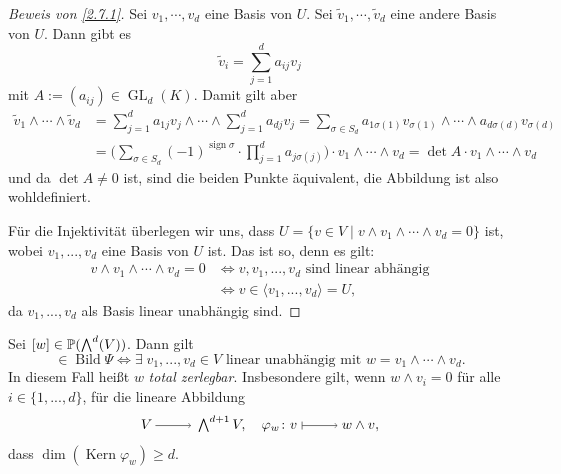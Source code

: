 \documentclass[a4paper,12pt,index=toc]{scrbook}
\theoremstyle{keinenummern} %
\def\P{\mathbb{P}}
\newcommand{\Kern}{\operatorname{Kern}}
\newcommand{\Bild}{\operatorname{Bild}}
\newcommand{\GL}{\operatorname{GL}}
\newcommand{\sign}{\operatorname{sign}}
\renewcommand{\dotsc}{\ensuremath{\!...}}
\newcommand{\schlange}[1]{\widetilde{#1}}
\let\grassmann\bigwedge
\def\bigwedge{\begingroup\textstyle\grassmann\endgroup}
\begin{document}
\begin{proof}[Beweis von \cref{2.7.1}]
Sei $v_1,\dotsm ,v_d$ eine Basis von $U$.
Sei $\schlange{v}_{1},\dotsm,\schlange{v}_{d}$ eine andere Basis von $U$. Dann gibt es
\begin{equation*}\schlange{v}_{i}=\sum_{j=1}^{d}a_{ij}v_{j}\end{equation*}
mit $A:=(a_{ij})\in\GL_{d}(K)$. Damit gilt aber
\begin{align*}
\schlange{v}_{1}\wedge\dotsm\wedge\schlange{v}_{d}&=\sum_{j=1}^{d}a_{1j}v_{j}\wedge\dotsm\wedge\sum_{j=1}^{d}a_{dj}v_{j}=\sum_{\sigma\in S_{d}}a_{1\sigma(1)}v_{\sigma(1)}\wedge\dotsm\wedge a_{d\sigma(d)}v_{\sigma(d)}\\
&=\biggl(\sum_{\sigma\in S_{d}}(-1)^{\sign\sigma}\cdot\prod_{j=1}^{d}a_{j\sigma(j)}\biggr)\cdot v_{1}\wedge\dotsm\wedge v_{d}=\det A\cdot v_{1}\wedge\dotsm\wedge v_{d}
\end{align*}
und da $\det A\neq 0$ ist, sind die beiden Punkte äquivalent, die Abbildung ist also wohldefiniert.

Für die Injektivität überlegen wir uns, dass $U=\{v\in V\mid v\wedge v_{1}\wedge\dotsm\wedge v_{d}=0\}$ ist, wobei $v_{1},\dotsc, v_{d}$ eine Basis von $U$ ist. Das ist so, denn es gilt:
\begin{align*}
v\wedge v_{1}\wedge\dotsm\wedge v_{d}=0&\iff v,v_{1},\dotsc,v_{d}\text{ sind linear abhängig}\\
&\iff v\in\langle v_{1},\dotsc,v_{d}\rangle=U,
\end{align*}
da $v_{1},\dotsc,v_{d}$ als Basis linear unabhängig sind.
\end{proof}

\begin{db}\label{2.7.2}
Sei $[w]\in\P(\bigwedge^{d}(V))$. Dann gilt
\begin{equation*}[w]\in\Bild\Psi\iff\exists\; v_{1},\dotsc,v_{d}\in V\text{ linear unabhängig mit }w=v_{1}\wedge\dotsm\wedge v_{d}.\end{equation*}
In diesem Fall heißt $w$ \emph{total zerlegbar}. Insbesondere gilt, wenn $w\wedge v_{i}=0$ für alle $i\in\{1,\dotsc,d\}$, für die lineare Abbildung
\begin{equation*}V\ra\bigwedge^{d+1}V,\quad \varphi_{w}\colon v\mapsto w\wedge v,\end{equation*}
dass $\dim(\Kern\varphi_{w})\geq d$.
\end{db}
\end{document}
